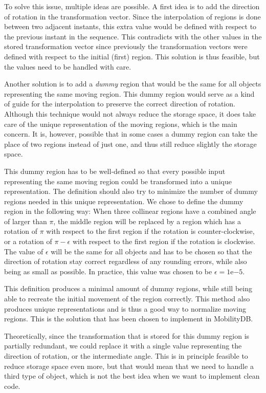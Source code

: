 To solve this issue, multiple ideas are possible. A first idea is to add the direction of rotation in the transformation vector. Since the interpolation of regions is done between two adjacent instants, this extra value would be defined with respect to the previous instant in the sequence. This contradicts with the other values in the stored transformation vector since previously the transformation vectors were defined with respect to the initial (first) region. This solution is thus feasible, but the values need to be handled with care.

Another solution is to add a \textit{dummy} region that would be the same for all objects representing the same moving region. This dummy region would serve as a kind of guide for the interpolation to preserve the correct direction of rotation. Although this technique would not always reduce the storage space, it does take care of the unique representation of the moving regions, which is the main concern. It is, however, possible that in some cases a dummy region can take the place of two regions instead of just one, and thus still reduce slightly the storage space.

This dummy region has to be well-defined so that every possible input representing the same moving region could be transformed into a unique representation. The definition should also try to minimize the number of dummy regions needed in this unique representation. We chose to define the dummy region in the following way: When three collinear regions have a combined angle of larger than $\pi$, the middle region will be replaced by a region which has a rotation of $\pi$ with respect to the first region if the rotation is counter-clockwise, or a rotation of $\pi - \epsilon$ with respect to the first region if the rotation is clockwise. The value of $\epsilon$ will be the same for all objects and has to be chosen so that the direction of rotation stay correct regardless of any rounding errors, while also being as small as possible. In practice, this value was chosen to be $\epsilon = 1\mathrm{e}{-5}$.

This definition produces a minimal amount of dummy regions, while still being able to recreate the initial movement of the region correctly. This method also produces unique representations and is thus a good way to normalize moving regions. This is the solution that has been chosen to implement in MobilityDB.

Theoretically, since the transformation that is stored for this dummy region is partially redundant, we could replace it with a single value representing the direction of rotation, or the intermediate angle. This is in principle feasible to reduce storage space even more, but that would mean that we need to handle a third type of object, which is not the best idea when we want to implement clean code. 

